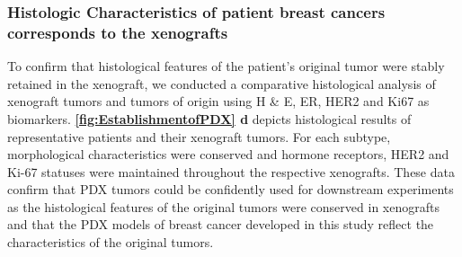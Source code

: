 \subsubsection{Histologic Characteristics of patient breast cancers corresponds to the xenografts}

To confirm that histological features of the patient’s original tumor were stably retained in the xenograft, we conducted a comparative histological analysis of xenograft tumors and tumors of origin using H \& E, ER, HER2 and Ki67 as biomarkers. 
\textbf{\autoref{fig:EstablishmentofPDX} d} depicts histological results of representative patients and their xenograft tumors. For each subtype, morphological characteristics were conserved and hormone receptors, HER2 and Ki-67 statuses were maintained throughout the respective xenografts. These data confirm that PDX tumors could be confidently used for downstream experiments as the histological features of the original tumors were conserved in xenografts and that the PDX models of breast cancer developed in this study reflect the characteristics of the original tumors.



